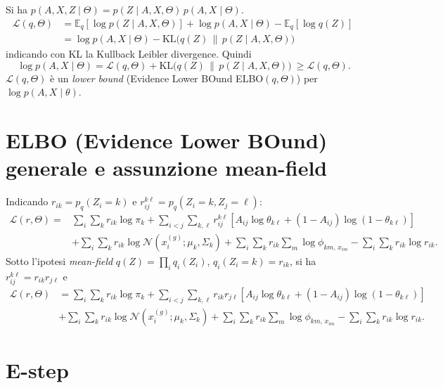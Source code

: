 \documentclass[11pt,a4paper]{article}
\begin{document}
Si ha $p(A,X,Z\mid \Theta)=p(Z\mid A,X,\Theta)\,p(A,X\mid\Theta)$.
\begin{align}
\mathcal{L}(q,\Theta)
&=\mathbb{E}_q[\log p(Z\mid A,X,\Theta)]+\log p(A,X\mid\Theta)-\mathbb{E}_q[\log q(Z)] \label{eq:elbo5}\\
&=\log p(A,X\mid\Theta)-\mathrm{KL}\!\big(q(Z)\,\|\,p(Z\mid A,X,\Theta)\big)
\label{eq:elbo7}
\end{align}
indicando con KL la Kullback Leibler divergence.
Quindi
\[
\ \log p(A,X\mid\Theta)=\mathcal{L}(q,\Theta)+\mathrm{KL}\!\big(q(Z)\,\|\,p(Z\mid A,X,\Theta)\big)\ \ge \mathcal{L}(q,\Theta).
\]
$ \mathcal{L}(q,\Theta)$ è un \emph{lower bound} (Evidence Lower BOund ELBO$(q,\Theta)$) per $\log p(A,X\mid\theta)$.

\section{ELBO (Evidence Lower BOund) generale e assunzione mean-field}
Indicando $r_{ik}=p_q(Z_i=k)$ e $r_{ij}^{k\ell}=p_q(Z_i=k,Z_j=\ell)$:
\begin{align*}
\mathcal{L}(r,\Theta)=
&\sum_i\sum_k r_{ik}\log \pi_k
+\sum_{i<j}\sum_{k,\ell} r_{ij}^{k\ell}[A_{ij}\log\theta_{k\ell}+(1-A_{ij})\log(1-\theta_{k\ell})]\\
&+\sum_i\sum_k r_{ik}\log \mathcal{N}(x_i^{(g)};\mu_k,\Sigma_k)
+\sum_i\sum_k r_{ik}\sum_m \log \phi_{k m,\,x_{im}}
-\sum_i\sum_k r_{ik}\log r_{ik}.
\end{align*}
Sotto l'ipotesi \emph{mean-field} $q(Z)=\prod_i q_i(Z_i)$, $q_i(Z_i=k)=r_{ik}$, si ha $r_{ij}^{k\ell}=r_{ik}r_{j\ell}$ e
\begin{align*}
\mathcal{L}(r,\Theta)
&=\sum_i\sum_k r_{ik}\log \pi_k+\sum_{i<j}\sum_{k,\ell} r_{ik}r_{j\ell}[A_{ij}\log\theta_{k\ell}+(1-A_{ij})\log(1-\theta_{k\ell})]\nonumber\\
&+\sum_i\sum_k r_{ik}\log \mathcal{N}(x_i^{(g)};\mu_k,\Sigma_k)
+\sum_i\sum_k r_{ik}\sum_m \log \phi_{k m,\,x_{im}}
-\sum_i\sum_k r_{ik}\log r_{ik}.
\label{eq:ELBO}
\end{align*}



\section{E-step}


\end{document}
